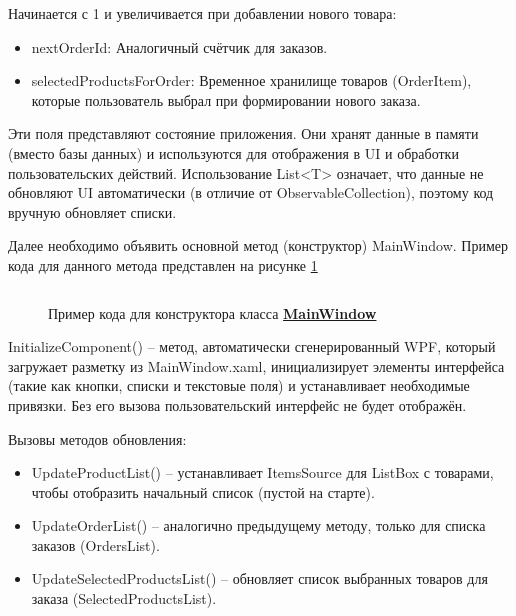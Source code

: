 \documentclass[12pt]{article}
\newcommand{\colorGIT}[1]{\textbf{#1}}
\renewcommand{\texttt}[1]{{\small\ttfamily #1}}
\numberwithin{listing}{section}
\numberwithin{figure}{section}
\begin{document}
\noindent Начинается с 1 и увеличивается при добавлении нового товара:
\begin{itemize}
	\item \texttt{nextOrderId}: Аналогичный счётчик для заказов.
	\item \texttt{selectedProductsForOrder}: Временное хранилище товаров (\texttt{OrderItem}), которые пользователь выбрал при формировании нового заказа.
\end{itemize}

Эти поля представляют состояние приложения. Они хранят данные в памяти (вместо базы данных) и используются для отображения в \texttt{UI} и обработки пользовательских действий. Использование \texttt{List<T>} означает, что данные не обновляют \texttt{UI} автоматически (в отличие от \texttt{Observable\-Collection}), поэтому код вручную обновляет списки.

{}
Далее необходимо объявить основной метод (конструктор) \texttt{MainWindow}.
Пример кода для данного метода представлен на рисунке \ref{fig:Main2}

\begin{figure}[H]
	\centering
	\inputminted[firstline=24, lastline=30]{csharp}{../../3lab/StoreManager/MainWindow.xaml.cs}
	\caption{Пример кода для конструктора класса \colorGIT{\href{https://github.com/WebMasterIT/Csharp_Labs/blob=ec375afd16c0647b337cf3d8a79c8bef904fc1be/3lab/StoreManager/MainWindow.xaml.cs\#L24-L30}{MainWindow}}}
	\label{fig:Main2}
\end{figure}

\texttt{InitializeComponent()} -- метод, автоматически сгенерированный \texttt{WPF}, который загружает разметку из \texttt{MainWindow.xaml}, инициализирует элементы интерфейса (такие как кнопки, списки и текстовые поля) и устанавливает необходимые привязки. Без его вызова пользовательский интерфейс не будет отображён.

\noindent Вызовы методов обновления:
\begin{itemize}
	\item \texttt{UpdateProductList()} -- устанавливает \texttt{ItemsSource} для \texttt{ListBox} с товарами, чтобы отобразить начальный список (пустой на старте).
	\item \texttt{UpdateOrderList()} -- аналогично предыдущему методу, только для списка заказов (\texttt{Or\-dersList}).
	\item \texttt{UpdateSelectedProductsList()} -- обновляет список выбранных товаров для заказа (\texttt{Sel\-ected\-ProductsList}).
\end{itemize}
\end{document}
